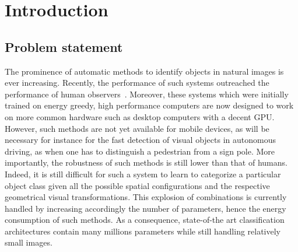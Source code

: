 \section{Introduction}
\label{sec:intro}
\CNS
\subsection{Problem statement}
\fi
The prominence of automatic methods to identify objects in natural images is ever increasing. Recently, the performance of such systems outreached the performance of human observers~\citep{He15}. Moreover, these systems which were initially trained on energy greedy, high performance computers are now designed to work on more common hardware such as desktop computers with a decent GPU. \CNS
However, such methods are not yet available for mobile devices, as will be necessary for instance for the fast detection of visual objects in autonomous driving, as when one has to distinguish a pedestrian from a sign pole. More importantly, the robustness of such methods is still lower than that of humans. Indeed, it is still difficult for such a system to learn to categorize a particular object class given all the possible spatial configurations and the respective geometrical visual transformations. This explosion of combinations is currently handled by increasing accordingly the number of parameters, hence the energy consumption of such methods. As a consequence, state-of-the art classification architectures contain many millions parameters while still handling relatively small images.

